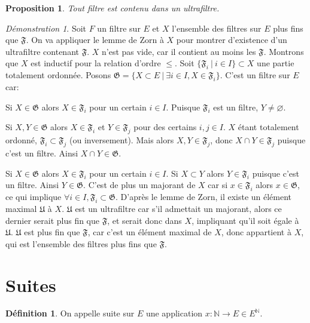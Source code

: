 \documentclass[a4paper, 11pt, french]{book}
\newenvironment{itemise}{\itemize}{\enditemize}
\theoremstyle{plain} %
\newtheorem{proposition}{Proposition}
\theoremstyle{definition} %
\newtheorem{definition}{Définition}
\theoremstyle{remark} %
\newtheorem*{demonstration}{Démonstration}
\newcommand{\1}{\mathds{1}}
\newcommand\vide{\varnothing}
\newcommand{\infegal}{\leqslant}
\newcommand{\N}{\mathbb{N}}
\newcommand\ens[2]{\{#1 \ |\ #2\}}
\begin{document}
\begin{proposition}
	Tout filtre est contenu dans un ultrafiltre.
\end{proposition}

\begin{demonstration}
	Soit $F$ un filtre sur $E$ et $X$ l'ensemble des filtres sur $E$ plus fins que $\mathfrak{F}$.
	On va appliquer le lemme de Zorn à $X$ pour montrer d'existence d'un ultrafiltre contenant $\mathfrak{F}$.
	$X$ n'est pas vide, car il contient au moins les $\mathfrak{F}$.
	Montrons que $X$ est inductif pour la relation d'ordre $\infegal$.
	Soit $\ens{\mathfrak{F}_i}{i\in I}\subset X$ une partie totalement ordonnée.
	Posons $\mathfrak{G}=\ens{X\subset E}{\exists i\in I, X\in\mathfrak{F}_i}$.
	C'est un filtre sur $E$ car:
	\begin{itemise}
		\item Si $X\in\mathfrak{G}$ alors $X\in\mathfrak{F}_i$ pour un certain $i\in I$.
		Puisque $\mathfrak{F}_i$ est un filtre, $Y\neq\vide$.
		\item Si $X, Y\in\mathfrak{G}$ alors $X\in\mathfrak{F}_i$ et $Y\in\mathfrak{F}_j$ pour des certains $i, j\in I$.
		$X$ étant totalement ordonné, $\mathfrak{F}_i\subset\mathfrak{F}_j$ (ou inversement).
		Mais alors $X, Y\in\mathfrak{F}_j$, donc $X\cap Y\in\mathfrak{F}_j$ puisque c'est un filtre.
		Ainsi $X\cap Y\in\mathfrak{G}$.
		\item Si $X\in\mathfrak{G}$ alors $X\in\mathfrak{F}_i$ pour un certain $i\in I$.
		Si $X\subset Y$ alors $Y\in\mathfrak{F}_i$ puisque c'est un filtre.
		Ainsi $Y\in\mathfrak{G}$.
	\end{itemise}
	C'est de plus un majorant de $X$ car si $x\in\mathfrak{F}_i$ alors $x\in\mathfrak{G}$, ce qui implique $\forall i\in I, \mathfrak{F}_i\subset\mathfrak{G}$.
	D'après le lemme de Zorn, il existe un élément maximal $\mathfrak{U}$ à $X$.
	$\mathfrak{U}$ est un ultrafiltre car s'il admettait un majorant, alors ce dernier serait plus fin que $\mathfrak{F}$, et serait donc dans $X$, impliquant qu'il soit égale à $\mathfrak{U}$.
	$\mathfrak{U}$ est plus fin que $\mathfrak{F}$, car c'est un élément maximal de $X$, donc appartient à $X$, qui est l'ensemble des filtres plus fins que $\mathfrak{F}$.
\end{demonstration}

\section{Suites}

\begin{definition}
	On appelle suite sur $E$ une application $x:\N\rightarrow E\in E^\N$.
\end{definition}
\end{document}
